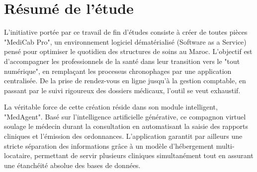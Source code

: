 \documentclass[final]{report}
\begin{document}
\begin{acronym}[KUBERNETES]
\end{acronym}
 
\newpage
 
\chapter*{Résumé de l'étude}
 
L'initiative portée par ce travail de fin d'études consiste à créer de toutes pièces "MediCab Pro", un environnement logiciel dématérialisé (Software as a Service) pensé pour optimiser le quotidien des structures de soins au Maroc. L'objectif est d'accompagner les professionnels de la santé dans leur transition vers le "tout numérique", en remplaçant les processus chronophages par une application centralisée. De la prise de rendez-vous en ligne jusqu'à la gestion comptable, en passant par le suivi rigoureux des dossiers médicaux, l'outil se veut exhaustif.
 
La véritable force de cette création réside dans son module intelligent, "MedAgent". Basé sur l'intelligence artificielle générative, ce compagnon virtuel soulage le médecin durant la consultation en automatisant la saisie des rapports cliniques et l'émission des ordonnances. L'application garantit par ailleurs une stricte séparation des informations grâce à un modèle d'hébergement multi-locataire, permettant de servir plusieurs cliniques simultanément tout en assurant une étanchéité absolue des bases de données.
 
\end{document}
